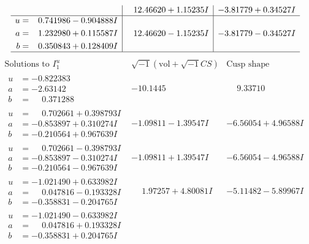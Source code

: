 \documentclass[1p]{elsarticle_modified}
\theoremstyle{definition}
\newcommand{\I}{\sqrt{-1}}
\begin{document}
$$\begin{array}{c|c|c}
 & \phantom{-}12.46620 + 1.15235 I & -3.81779 + 0.34527 I \\ \hline\begin{aligned}
u &= \phantom{-}0.741986 - 0.904888 I \\
a &= \phantom{-}1.232980 + 0.115587 I \\
b &= \phantom{-}0.350843 + 0.128409 I\end{aligned}
 & \phantom{-}12.46620 - 1.15235 I & -3.81779 - 0.34527 I\\
 \hline 
 \end{array}$$\newpage$$\begin{array}{c|c|c}  
\text{Solutions to }I^u_{1}& \I (\text{vol} + \sqrt{-1}CS) & \text{Cusp shape}\\
 \hline 
\begin{aligned}
u &= -0.822383\phantom{ +0.000000I} \\
a &= -2.63142\phantom{ +0.000000I} \\
b &= \phantom{-}0.371288\phantom{ +0.000000I}\end{aligned}
 & -10.1445\phantom{ +0.000000I} & \phantom{-}9.33710\phantom{ +0.000000I} \\ \hline\begin{aligned}
u &= \phantom{-}0.702661 + 0.398793 I \\
a &= -0.853897 + 0.310274 I \\
b &= -0.210564 + 0.967639 I\end{aligned}
 & -1.09811 - 1.39547 I & -6.56054 + 4.96588 I \\ \hline\begin{aligned}
u &= \phantom{-}0.702661 - 0.398793 I \\
a &= -0.853897 - 0.310274 I \\
b &= -0.210564 - 0.967639 I\end{aligned}
 & -1.09811 + 1.39547 I & -6.56054 - 4.96588 I \\ \hline\begin{aligned}
u &= -1.021490 + 0.633982 I \\
a &= \phantom{-}0.047816 - 0.193328 I \\
b &= -0.358831 - 0.204765 I\end{aligned}
 & \phantom{-}1.97257 + 4.80081 I & -5.11482 - 5.89967 I \\ \hline\begin{aligned}
u &= -1.021490 - 0.633982 I \\
a &= \phantom{-}0.047816 + 0.193328 I \\
b &= -0.358831 + 0.204765 I\end{aligned}

\end{array}$$
\end{document}

